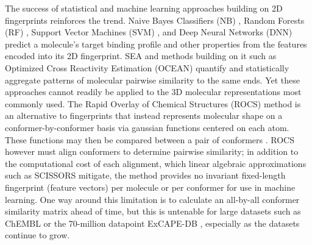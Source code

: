 \documentclass[../main.tex]{subfiles}
\begin{document}
\begin{refsection}
The success of statistical and machine learning approaches building on 2D fingerprints reinforces the trend.
Naive Bayes Classifiers (NB) \cite{zhang_2004,chen_2007,bender_2004}, Random Forests (RF) \cite{breiman_2001,svetnik_2003}, Support Vector Machines (SVM) \cite{chen_2007,cortes_1995,franke_2005}, and Deep Neural Networks (DNN) \cite{dahl_website_2014,ramsundar_2015,kearnes_2016,baskin_2016,unterthiner_2014} predict a molecule's target binding profile and other properties from the features encoded into its 2D fingerprint.
SEA and methods building on it such as Optimized Cross Reactivity Estimation (OCEAN) \cite{czodrowski_2016} quantify and statistically aggregate patterns of molecular pairwise similarity to the same ends.
Yet these approaches cannot readily be applied to the 3D molecular representations most commonly used.
The Rapid Overlay of Chemical Structures (ROCS) method is an alternative to fingerprints that instead represents molecular shape on a conformer-by-conformer basis via gaussian functions centered on each atom.
These functions may then be compared between a pair of conformers \cite{hawkins_2007,rush_2005}.
ROCS however must align conformers to determine pairwise similarity; in addition to the computational cost of each alignment, which linear algebraic approximations such as SCISSORS \cite{haque_2010} mitigate, the method provides no invariant fixed-length fingerprint (feature vectors) per molecule or per conformer for use in machine learning.
One way around this limitation is to calculate an all-by-all conformer similarity matrix ahead of time, but this is untenable for large datasets such as ChEMBL \cite{bento_2014} or the 70-million datapoint ExCAPE-DB  \cite{sun_2017}, especially as the datasets continue to grow.


\end{refsection}
\end{document}
